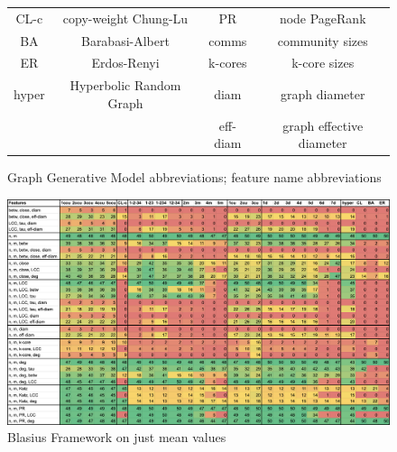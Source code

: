 \begin{figure}
\begin{tabular}{|c|c||c|c|}
        CL-c & copy-weight Chung-Lu
        & PR & node PageRank
        \\
        BA & Barabasi-Albert
        & comms & community sizes
        \\
        ER & Erdos-Renyi
        & k-cores & k-core sizes
        \\
        hyper & Hyperbolic Random Graph &
        diam & graph diameter
        \\
        && eff-diam & graph effective diameter\\
        \hline
    \end{tabular}
    \caption{Graph Generative Model abbreviations; feature name abbreviations}
\end{figure}

\begin{figure}
    \centering
    \includegraphics[width=\textwidth]{./figures/blasius_framework_means.png}
    \caption{Blasius Framework on just mean values}
    \label{fig:blasius_framework_means}
\end{figure}
